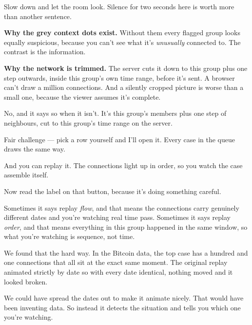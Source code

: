 \documentclass[11pt]{article}
\begin{document}
\begin{means}
Slow down and let the room look. Silence for two seconds here is worth more
than another sentence.

\textbf{Why the grey context dots exist.} Without them every flagged group
looks equally suspicious, because you can't see what it's \emph{unusually}
connected to. The contrast is the information.

\textbf{Why the network is trimmed.} The server cuts it down to this group plus
one step outwards, inside this group's own time range, before it's sent. A
browser can't draw a million connections. And a silently cropped picture is
worse than a small one, because the viewer assumes it's complete.
\end{means}

\begin{asked}
 No, and it says so when it isn't. It's this
group's members plus one step of neighbours, cut to this group's time range on
the server.

 Fair challenge --- pick a row
yourself and I'll open it. Every case in the queue draws the same way.
\end{asked}


\begin{saythis}
And you can replay it.  The connections light up in order, so
you watch the case assemble itself.

Now read the label on that button, because it's doing something careful.

Sometimes it says replay \emph{flow}, and that means the connections carry
genuinely different dates and you're watching real time pass. Sometimes it says
replay \emph{order}, and that means everything in this group happened in the
same window, so what you're watching is sequence, not time.

We found that the hard way. In the Bitcoin data, the top case has a hundred and
one connections that all sit at the exact same moment. The original replay
animated strictly by date \bt so with every date identical, nothing moved and
it looked broken.

We could have spread the dates out to make it animate nicely. That would have
been inventing data. So instead it detects the situation and tells you which
one you're watching.
\end{saythis}
\end{document}
